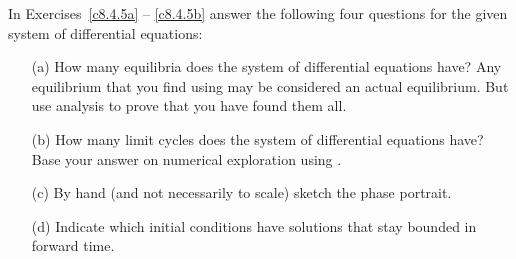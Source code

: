 \documentclass{ximera}
\begin{document}
\noindent In Exercises~\ref{c8.4.5a} -- \ref{c8.4.5b} answer the following 
four questions for the given system of differential equations:
\begin{itemize}
\item[(a)]  How many equilibria does the system of differential equations 
have?  Any equilibrium that you find using {\pplane} may be considered an 
actual equilibrium.  But use analysis to prove that you have found them all.
\item[(b)]  How many limit cycles does the system of differential equations 
have?  Base your answer on numerical exploration using {\pplane}.
\item[(c)]  By hand (and not necessarily to scale) sketch the phase portrait.
\item[(d)]  Indicate which initial conditions have solutions that stay
bounded in forward time.
\end{itemize}
\end{document}
